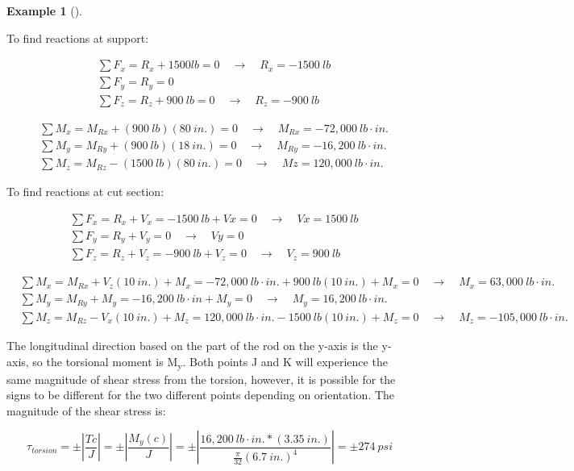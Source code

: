 \documentclass[
  letterpaper,
  DIV=11,
  numbers=noendperiod]{scrreprt}
\theoremstyle{definition}
\newtheorem{example}{Example}[chapter]
\theoremstyle{remark}
\begin{document}
\begin{tcolorbox}
\begin{example}[]
\begin{tcolorbox}
To find reactions at support:

\[
\begin{aligned}
& \sum F_x=R_x+1500{lb}=0 \quad\rightarrow\quad R_x=-1500{~lb} \\
& \sum F_y=R_y=0 \\
& \sum F_z=R_z+900{~lb}=0 \quad\rightarrow\quad R_z=-900{~lb}
\end{aligned}
\]

\[
\begin{aligned}
& \sum M_x=M_{Rx}+(900{~lb})(80{~in.})=0 \quad\rightarrow\quad M_{Rx}=-72,000{~lb}\cdot{in.} \\
& \sum M_y=M_{Ry}+(900{~lb})(18{~in.})=0 \quad\rightarrow\quad M_{Ry}=-16,200{~lb}\cdot{in.} \\
& \sum M_z=M_{Rz}-(1500{~lb})(80{~in.})=0 \quad\rightarrow\quad {Mz}=120,000{~lb}\cdot{in.}
\end{aligned}
\]

To find reactions at cut section:

\[
\begin{aligned}
& \sum F_x=R_x+V_x=-1500{~lb}+V x=0 \quad\rightarrow\quad V x=1500{~lb} \\
& \sum F_y=R_y+V_y=0 \quad\rightarrow\quad V y=0 \\
& \sum F_z=R_z+V_z=-900{~lb}+V_z=0 \quad\rightarrow\quad V_z=900{~lb}
\end{aligned}
\]

\[
\begin{aligned}
& \sum M_x=M_{Rx}+V_z(10{~in.})+M_x=-72,000{~lb}\cdot{in.}+900{~lb}(10{~in.})+M_x=0 \quad\rightarrow\quad M_x=63,000{~lb}\cdot{in.} \\
& \sum M_y=M_{Ry}+M_y=-16,200{~lb}\cdot{in}+M_y=0 \quad\rightarrow\quad M_y=16,200{~lb}\cdot{in.} \\
& \sum M_z=M_{Rz}-V_x(10{~in.})+M_z=120,000{~lb}\cdot{in.}-1500{~lb}(10{~in.})+M_z=0 \quad\rightarrow\quad M_z=-105,000{~lb}\cdot{in.}
\end{aligned}
\]

The longitudinal direction based on the part of the rod on the y-axis is
the y-axis, so the torsional moment is M\textsubscript{y}. Both points J
and K will experience the same magnitude of shear stress from the
torsion, however, it is possible for the signs to be different for the
two different points depending on orientation. The magnitude of the
shear stress is:

\[
\tau_{torsion}= \pm\left|\frac{Tc}{J}\right|=\pm\left|\frac{M_y(c)}{J}\right|= \pm\left|\frac{16,200{~lb}\cdot{in.}*(3.35{~in.})}{\frac{\pi}{32}(6.7{~in.})^4}\right|= \pm 274{~psi}
\]


\end{tcolorbox}
\end{example}
\end{tcolorbox}
\end{document}
